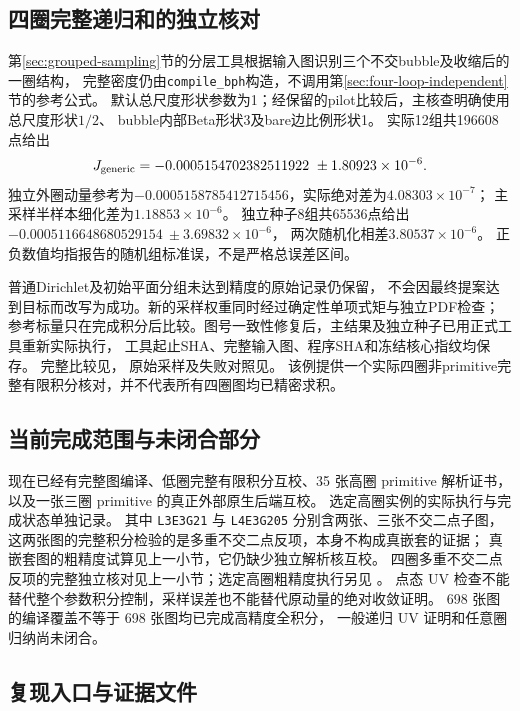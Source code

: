 \subsection{四圈完整递归和的独立核对}

第\ref{sec:grouped-sampling}节的分层工具根据输入图识别三个不交bubble及收缩后的一圈结构，
完整密度仍由\texttt{compile\_bph}构造，不调用第\ref{sec:four-loop-independent}节的参考公式。
默认总尺度形状参数为1；经保留的pilot比较后，主核查明确使用总尺度形状$1/2$、
bubble内部Beta形状3及bare边比例形状1。
实际12组共196608点给出
\[
 J_{\rm generic}=-0.0005154702382511922\ \pm1.80923\times10^{-6}.
\]
独立外圈动量参考为$-0.0005158785412715456$，实际绝对差为$4.08303\times10^{-7}$；
主采样半样本细化差为$1.18853\times10^{-6}$。
独立种子8组共65536点给出
$-0.0005116648680529154\ \pm3.69832\times10^{-6}$，
两次随机化相差$3.80537\times10^{-6}$。
正负数值均指报告的随机组标准误，不是严格总误差区间。

普通Dirichlet及初始平面分组未达到精度的原始记录仍保留，
不会因最终提案达到目标而改写为成功。新的采样权重同时经过确定性单项式矩与独立PDF检查；
参考标量只在完成积分后比较。图号一致性修复后，主结果及独立种子已用正式工具重新实际执行，
工具起止SHA、完整输入图、程序SHA和冻结核心指纹均保存。
完整比较见，
原始采样及失败对照见。
该例提供一个实际四圈非primitive完整有限积分核对，并不代表所有四圈图均已精密求积。

\subsection{当前完成范围与未闭合部分}

现在已经有完整图编译、低圈完整有限积分互校、35 张高圈 primitive 解析证书，
以及一张三圈 primitive 的真正外部原生后端互校。
选定高圈实例的实际执行与完成状态单独记录。
其中 \texttt{L3E3G21} 与 \texttt{L4E3G205} 分别含两张、三张不交二点子图，
这两张图的完整积分检验的是多重不交二点反项，本身不构成真嵌套的证据；
真嵌套图的粗精度试算见上一小节，它仍缺少独立解析核互校。
四圈多重不交二点反项的完整独立核对见上一小节；选定高圈粗精度执行另见
。
点态 UV 检查不能替代整个参数积分控制，采样误差也不能替代原动量的绝对收敛证明。
698 张图的编译覆盖不等于 698 张图均已完成高精度全积分，
一般递归 UV 证明和任意圈归纳尚未闭合。

\subsection{复现入口与证据文件}

